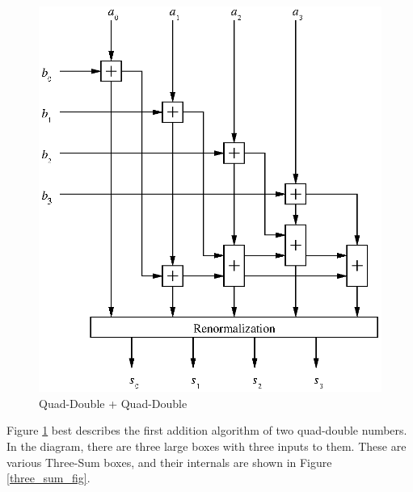 \documentclass[11pt]{article}
\theoremstyle{definition}
\begin{document}
\begin{figure}
  \begin{center} 
    \includegraphics{qd_add.eps}
    \caption{\label{qd_add_fig}Quad-Double + Quad-Double}
  \end{center}
\end{figure}

Figure \ref{qd_add_fig} best describes the first addition algorithm of two
quad-double numbers.  In the diagram, there are three large boxes
with three inputs to them.  These are various {\sc Three-Sum} boxes, 
and their internals are shown in Figure \ref{three_sum_fig}.
\end{document}
